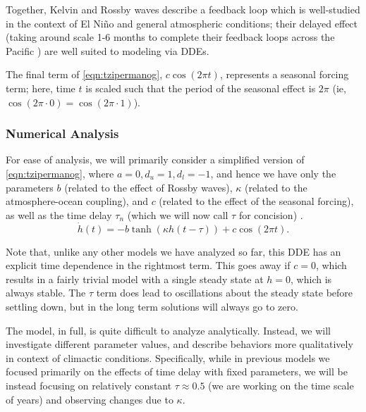 \documentclass[12pt]{article}
\begin{document}
Together, Kelvin and Rossby waves describe a feedback loop which is well-studied in the context of El Niño and general atmospheric conditions; their delayed effect (taking around scale 1-6 months to complete their feedback loops across the Pacific \cite{climatedde}) are well suited to modeling via DDEs.

The final term of \cref{eqn:tzipermanog}, $c \cos (2 \pi t)$, represents a seasonal forcing term; here, time $t$ is scaled such that the period of the seasonal effect is $2 \pi$ (ie, $\cos (2\pi \cdot 0) = \cos (2 \pi \cdot 1)$).

\subsubsection{Numerical Analysis}

For ease of analysis, we will primarily consider a simplified version of \cref{eqn:tzipermanog}, where $a = 0, d_u = 1, d_l = -1$, and hence we have only the parameters $b$ (related to the effect of Rossby waves), $\kappa$ (related to the atmosphere-ocean coupling), and $c$ (related to the effect of the seasonal forcing), as well as the time delay $\tau_n$ (which we will now call $\tau$ for concision) \cite{ghil}.
\begin{equation}\label{eqn:simplifiedtz}
    \dot{h}(t) = -b \tanh (\kappa h (t - \tau)) + c \cos (2 \pi t).
\end{equation} 

Note that, unlike any other models we have analyzed so far, this DDE has an explicit time dependence in the rightmost term. This goes away if $c = 0$, which results in a fairly trivial model with a single steady state at $h = 0$, which is always stable. The $\tau$ term does lead to oscillations about the steady state before settling down, but in the long term solutions will always go to zero.

The model, in full, is quite difficult to analyze analytically. Instead, we will investigate different parameter values, and describe behaviors more qualitatively in context of climactic conditions. Specifically, while in previous models we focused primarily on the effects of time delay with fixed parameters, we will be instead focusing on relatively constant $\tau \approx 0.5$ (we are working on the time scale of years) and observing changes due to $\kappa$.
\end{document}

